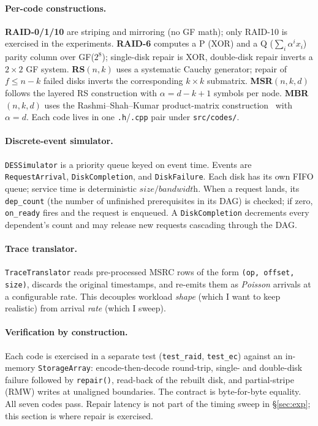\documentclass[letterpaper,twocolumn,10pt]{article}
\begin{document}
\paragraph{Per-code constructions.}
\textbf{RAID-0/1/10} are striping and mirroring (no GF math); only RAID-10
is exercised in the experiments. \textbf{RAID-6} computes a P (XOR) and a Q
($\sum_i \alpha^i x_i$) parity column over GF($2^8$); single-disk repair is
XOR, double-disk repair inverts a $2\times 2$ GF system. \textbf{RS$(n,k)$}
uses a systematic Cauchy generator; repair of $f \le n-k$ failed disks
inverts the corresponding $k\times k$ submatrix. \textbf{MSR$(n,k,d)$}
follows the layered RS construction with $\alpha = d{-}k{+}1$ symbols per
node. \textbf{MBR$(n,k,d)$} uses the Rashmi--Shah--Kumar product-matrix
construction~\cite{rashmi11} with $\alpha = d$. Each code lives in one
\texttt{.h}/\texttt{.cpp} pair under \texttt{src/codes/}.

\paragraph{Discrete-event simulator.}
\texttt{DESSimulator} is a priority queue keyed on event time. Events are
\texttt{RequestArrival}, \texttt{DiskCompletion}, and \texttt{DiskFailure}.
Each disk has its own FIFO queue; service time is deterministic
$\textit{size}/\textit{bandwidth}$. When a request lands, its
\texttt{dep\_count} (the number of unfinished prerequisites in its DAG) is
checked; if zero, \texttt{on\_ready} fires and the request is enqueued.
A \texttt{DiskCompletion} decrements every dependent's count and may
release new requests cascading through the DAG.

\paragraph{Trace translator.}
\texttt{TraceTranslator} reads pre-processed MSRC rows of the form
\texttt{(op, offset, size)}, discards the original timestamps, and
re-emits them as \emph{Poisson} arrivals at a configurable rate. This
decouples workload \emph{shape} (which I want to keep realistic) from
arrival \emph{rate} (which I sweep).

\paragraph{Verification by construction.}
Each code is exercised in a separate test (\texttt{test\_raid},
\texttt{test\_ec}) against an in-memory \texttt{StorageArray}: encode-then-decode
round-trip, single- and double-disk failure followed by \texttt{repair()},
read-back of the rebuilt disk, and partial-stripe (RMW) writes at unaligned
boundaries. The contract is byte-for-byte equality. All seven codes pass.
Repair latency is not part of the timing sweep in \S\ref{sec:exp}; this
section is where repair is exercised.
\end{document}
